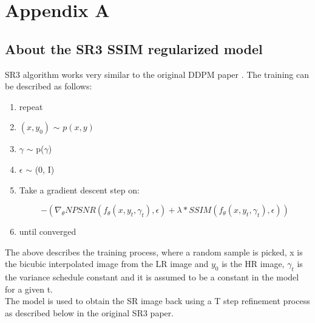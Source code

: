 \chapter{Appendix A}
\ifpdf
    \graphicspath{{Appendix1/images/}}
\else
    \graphicspath{{Appendix1/images/}}
\fi

\section{About the SR3 SSIM regularized model}

SR3 algorithm works very similar to the original DDPM paper \cite{ho2020denoising}. The training can be described as follows: \\

\begin{enumerate}
    \item repeat

    \item $(x, y_0)$ $\sim$ $p(x,y)$

    \item $\gamma$ $\sim$ p($\gamma$)

    \item $\epsilon$ $\sim$ (0, I)

    \item Take a gradient descent step on:
        
        $$ - (\nabla_{\theta}  NPSNR(f_{\theta}(x, y_{t}, \gamma_{t}), \epsilon) + \lambda * SSIM(f_{\theta}(x, y_{t}, \gamma_{t}), \epsilon))$$

    \item until converged
    
\end{enumerate}


The above describes the training process, where a random sample is picked, x is the bicubic interpolated image from the LR image and $y_{0}$ is the HR image, $\gamma_{t}$ is the variance schedule constant and it is assumed to be a constant in the model for a given t.\\

The model is used to obtain the SR image back using a T step refinement process as described below in the original SR3 paper.

